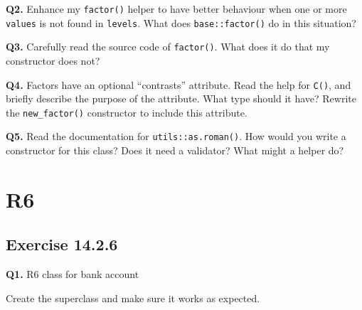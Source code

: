 \documentclass[
]{book}
\begin{document}
\textbf{Q2.} Enhance my \texttt{factor()} helper to have better behaviour when one or more \texttt{values} is not found in \texttt{levels}. What does \texttt{base::factor()} do in this situation?

\textbf{Q3.} Carefully read the source code of \texttt{factor()}. What does it do that my constructor does not?

\textbf{Q4.} Factors have an optional ``contrasts'' attribute. Read the help for \texttt{C()}, and briefly describe the purpose of the attribute. What type should it have? Rewrite the \texttt{new\_factor()} constructor to include this attribute.

\textbf{Q5.} Read the documentation for \texttt{utils::as.roman()}. How would you write a constructor for this class? Does it need a validator? What might a helper do?

\hypertarget{r6}{%
\chapter{R6}\label{r6}}

\hypertarget{exercise-14.2.6}{%
\section{Exercise 14.2.6}\label{exercise-14.2.6}}

\textbf{Q1.} R6 class for bank account

Create the superclass and make sure it works as expected.
\end{document}
